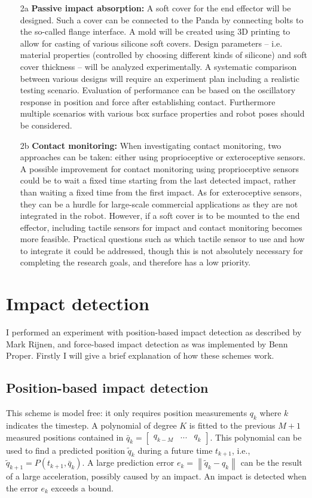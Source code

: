 \documentclass[11pt]{report}
\numberwithin{equation}{section}        %
\numberwithin{figure}{section}          %
\numberwithin{table}{section}           %
\begin{document}
\begin{enumerate}
   \item[2a] \textbf{Passive impact absorption:} A soft cover for the end effector will be designed. Such a cover can be connected to the Panda by connecting bolts to the so-called flange interface. A mold will be created using 3D printing to allow for casting of various silicone soft covers. Design parameters -- i.e. material properties (controlled by choosing different kinds of silicone) and soft cover thickness -- will be analyzed experimentally. A systematic comparison between various designs will require an experiment plan including a realistic testing scenario. Evaluation of performance can be based on the oscillatory response in position and force after establishing contact. Furthermore multiple scenarios with various box surface properties and robot poses should be considered.
  
  \item[2b] \textbf{Contact monitoring:} When investigating contact monitoring, two approaches can be taken: either using proprioceptive or exteroceptive sensors. A possible improvement for contact monitoring using proprioceptive sensors could be to wait a fixed time starting from the last detected impact, rather than waiting a fixed time from the first impact. As for exteroceptive sensors, they can be a hurdle for large-scale commercial applications as they are not integrated in the robot. However, if a soft cover is to be mounted to the end effector, including tactile sensors for impact and contact monitoring becomes more feasible. Practical questions such as which tactile sensor to use and how to integrate it could be addressed, though this is not absolutely necessary for completing the research goals, and therefore has a low priority.
  \end{enumerate}
  \newpage
  \section{Impact detection}\label{sec:impact}
  I performed an experiment with position-based impact detection as described by Mark Rijnen, and force-based impact detection as was implemented by Benn Proper. Firstly I will give a brief explanation of how these schemes work.

  \subsection{Position-based impact detection}
  This scheme is model free: it only requires position measurements $q_k$ where $k$ indicates the timestep. A polynomial of degree $K$ is fitted to the previous $M+1$ measured positions contained in $\bar{q}_k = \begin{bmatrix} q_{k-M}& ... & q_{k} \end{bmatrix}$. This polynomial can be used to find a predicted position $\tilde{q}_k$ during a future time $t_{k+1}$, i.e., $\tilde{q}_{k+1}=P(t_{k+1},\bar{q}_k)$. A large prediction error $e_{k}=\left \|  \tilde{q}_{k}-q_{k}\right \|$ can be the result of a large acceleration, possibly caused by an impact. An impact is detected when the error $e_k$ exceeds a bound.
\end{document}
